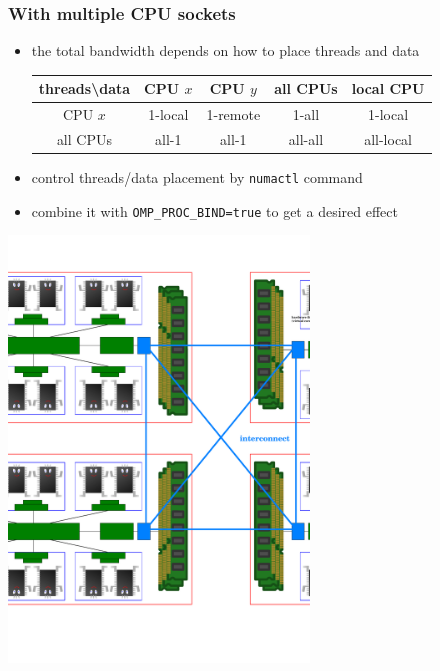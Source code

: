\documentclass[12pt,dvipdfmx]{beamer}
\begin{document}
\begin{frame}
\frametitle{With multiple CPU sockets}
\begin{itemize}
\item the total bandwidth depends on how to place threads and data
\begin{tabular}{|c|c|c|c|c|} \hline
threads\textbackslash data & CPU $x$ & CPU $y$ & all CPUs & local CPU  \\\hline
CPU $x$             & 1-local & 1-remote  & 1-all   & 1-local \\
all CPUs            & all-1   & all-1     & all-all & all-local \\\hline
\end{tabular}

\item control threads/data placement by {\tt numactl} command
\item combine it with {\tt OMP\_PROC\_BIND=true} to get a desired effect
\end{itemize}

\begin{center}
\includegraphics[width=0.6\textwidth]{out/pdf/svg/diagram_multisocket.pdf}
\end{center}
\end{frame}
\end{document}
